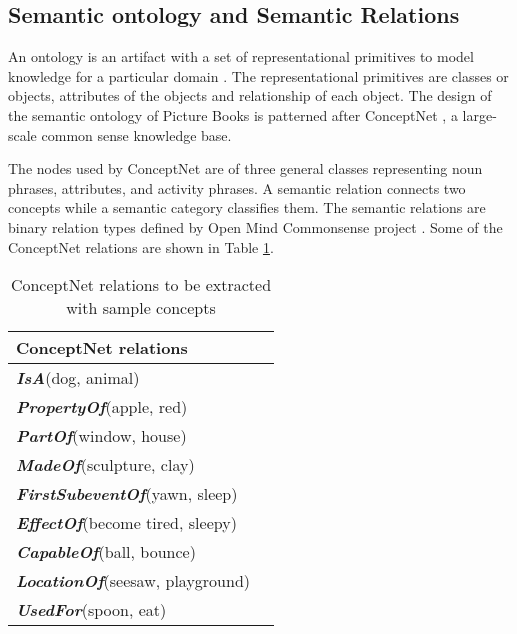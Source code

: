 %
%
%                 

\label{sec:appendixa}

\subsection{Semantic ontology and Semantic Relations}
\label{sec:semanticontology}

An ontology is an artifact with a set of representational primitives to model knowledge for a particular domain \cite{Gruber:2008}. The representational primitives are classes or objects, attributes of the objects and relationship of each object. The design of the semantic ontology of Picture Books is patterned after ConceptNet \cite{Liu:2004a}, a large-scale common sense knowledge base. 

The nodes used by ConceptNet are of three general classes representing noun phrases, attributes, and activity phrases. A semantic relation connects two concepts while a semantic category classifies them. The semantic relations are binary relation types defined by Open Mind Commonsense project \cite{Singh:2002}. Some of the ConceptNet relations are shown in Table \ref{tab:conceptnetrel}. 

\begin{table}[ht]   %
\centering
\caption{ConceptNet relations \protect \cite{Liu:2004b} to be extracted with sample concepts} \vspace{0.25em}
\begin{tabular}{|l|l|} \hline
ConceptNet relations \\ \hline
\textbf{\emph{IsA}}(dog, animal)  \\
\textbf{\emph{PropertyOf}}(apple, red) \\
\textbf{\emph{PartOf}}(window, house) \\ 
\textbf{\emph{MadeOf}}(sculpture, clay) \\
\textbf{\emph{FirstSubeventOf}}(yawn, sleep) \\
\textbf{\emph{EffectOf}}(become tired, sleepy) \\
\textbf{\emph{CapableOf}}(ball, bounce) \\
\textbf{\emph{LocationOf}}(seesaw, playground) \\
\textbf{\emph{UsedFor}}(spoon, eat) \\ \hline
\end{tabular}
\label{tab:conceptnetrel}
\end{table}

